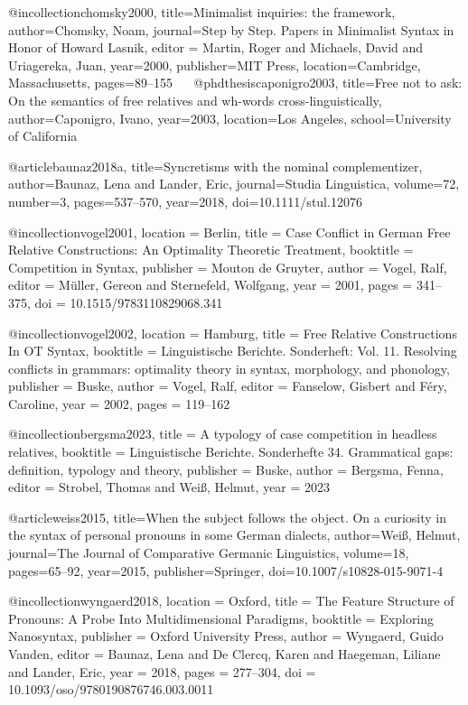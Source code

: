 

@incollection{chomsky2000,
  title={Minimalist inquiries: the framework},
  author={Chomsky, Noam},
  journal={Step by Step. Papers in Minimalist Syntax in Honor of Howard Lasnik},
  editor = {Martin, Roger and Michaels, David and Uriagereka, Juan},
  year={2000},
  publisher={MIT Press},
  location={Cambridge, Massachusetts},
  pages={89--155}
}
 
@phdthesis{caponigro2003,
  title={Free not to ask: On the semantics of free relatives and wh-words cross-linguistically},
  author={Caponigro, Ivano},
  year={2003},
  location={Los Angeles},
  school={University of California}
}


@article{baunaz2018a,
  title={Syncretisms with the nominal complementizer},
  author={Baunaz, Lena and Lander, Eric},
  journal={Studia Linguistica},
  volume={72},
  number={3},
  pages={537--570},
  year={2018},
  doi={10.1111/stul.12076}
}


@incollection{vogel2001,
  location = {Berlin},
  title = {Case Conflict in German Free Relative Constructions: {{An}} Optimality Theoretic Treatment},
  booktitle = {Competition in Syntax},
  publisher = {{Mouton de Gruyter}},
  author = {Vogel, Ralf},
  editor = {Müller, Gereon and Sternefeld, Wolfgang},
  year = {2001},
  pages = {341--375},
  doi = {10.1515/9783110829068.341}
}

@incollection{vogel2002,
  location = {Hamburg},
  title = {Free Relative Constructions In OT Syntax},
  booktitle = {Linguistische Berichte. Sonderheft: Vol. 11. Resolving conflicts in grammars: optimality theory in syntax, morphology, and phonology},
  publisher = {Buske},
  author = {Vogel, Ralf},
  editor = {Fanselow, Gisbert and Féry, Caroline},
  year = {2002},
  pages = {119--162}
}

@incollection{bergsma2023,
  title = {A typology of case competition in headless relatives},
  booktitle = {Linguistische Berichte. Sonderhefte 34. Grammatical gaps: definition, typology and theory},
  publisher = {Buske},
  author = {Bergsma, Fenna},
  editor = {Strobel, Thomas and Weiß, Helmut},
  year = {2023}
}

@article{weiss2015,
  title={When the subject follows the object. On a curiosity in the syntax of personal pronouns in some German dialects},
  author={Weiß, Helmut},
  journal={The Journal of Comparative Germanic Linguistics},
  volume={18},
  pages={65--92},
  year={2015},
  publisher={Springer},
  doi={10.1007/s10828-015-9071-4}
}

@incollection{wyngaerd2018,
  location = {Oxford},
  title = {The Feature Structure of Pronouns: A Probe Into Multidimensional Paradigms},
  booktitle = {Exploring Nanosyntax},
  publisher = {Oxford University Press},
  author = {Wyngaerd, Guido Vanden},
  editor = {Baunaz, Lena and De Clercq, Karen and Haegeman, Liliane and Lander, Eric},
  year = {2018},
  pages = {277--304},
  doi = {10.1093/oso/9780190876746.003.0011}
}


